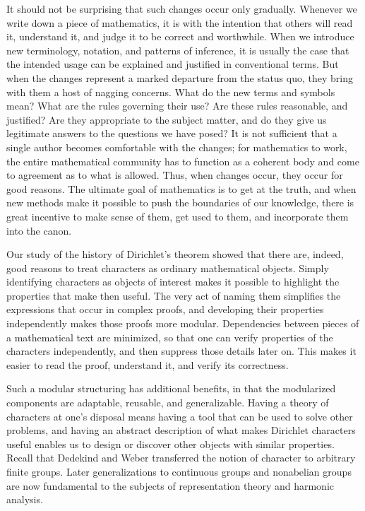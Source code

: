 \documentclass[12pt]{article}
\begin{document}
It should not be surprising that such changes occur only gradually. Whenever we write down a piece of mathematics, it is with the intention that others will read it, understand it, and judge it to be correct and worthwhile. When we introduce new terminology, notation, and patterns of inference, it is usually the case that the intended usage can be explained and justified in conventional terms. But when the changes represent a marked departure from the status quo, they bring with them a host of nagging concerns. What do the new terms and symbols mean? What are the rules governing their use? Are these rules reasonable, and justified? Are they appropriate to the subject matter, and do they give us legitimate answers to the questions we have posed? It is not sufficient that a single author becomes comfortable with the changes; for mathematics to work, the entire mathematical community has to function as a coherent body and come to agreement as to what is allowed. Thus, when changes occur, they occur for good reasons. The ultimate goal of mathematics is to get at the truth, and when new methods make it possible to push the boundaries of our knowledge, there is great incentive to make sense of them, get used to them, and incorporate them into the canon.

Our study of the history of Dirichlet's theorem showed that there are, indeed, good reasons to treat characters as ordinary mathematical objects. Simply identifying characters as objects of interest makes it possible to highlight the properties that make then useful. The very act of naming them simplifies the expressions that occur in complex proofs, and developing their properties independently makes those proofs more modular. Dependencies between pieces of a mathematical text are minimized, so that one can verify properties of the characters independently, and then suppress those details later on. This makes it easier to read the proof, understand it, and verify its correctness.

Such a modular structuring has additional benefits, in that the modularized components are adaptable, reusable, and generalizable. Having a theory of characters at one's disposal means having a tool that can be used to solve other problems, and having an abstract description of what makes Dirichlet characters useful enables us to design or discover other objects with similar properties. Recall that Dedekind and Weber transferred the notion of character to arbitrary finite groups. Later generalizations to continuous groups and nonabelian groups are now fundamental to the subjects of representation theory and harmonic analysis.
\end{document}

